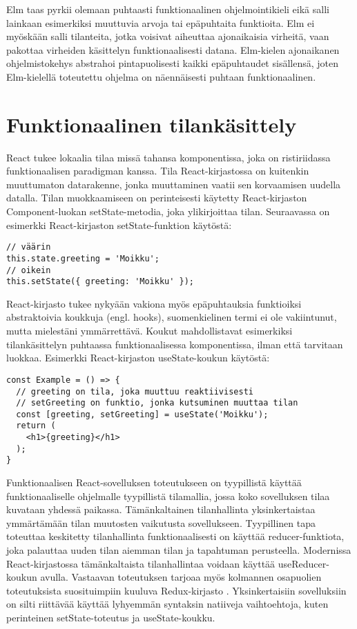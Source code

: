 Elm taas pyrkii olemaan puhtaasti funktionaalinen ohjelmointikieli eikä salli lainkaan esimerkiksi muuttuvia arvoja tai
epäpuhtaita funktioita. Elm ei myöskään salli tilanteita, jotka voisivat aiheuttaa ajonaikaisia virheitä, vaan pakottaa
virheiden käsittelyn funktionaalisesti datana. Elm-kielen ajonaikanen ohjelmistokehys abstrahoi pintapuolisesti kaikki
epäpuhtaudet sisällensä, joten Elm-kielellä toteutettu ohjelma on näennäisesti puhtaan funktionaalinen. \cite{elmlang}

\section{Funktionaalinen tilankäsittely}
React tukee lokaalia tilaa missä tahansa komponentissa, joka on ristiriidassa funktionaalisen paradigman kanssa. Tila
React-kirjastossa on kuitenkin muuttumaton datarakenne, jonka muuttaminen vaatii sen korvaamisen uudella datalla. Tilan
muokkaamiseen on perinteisesti käytetty React-kirjaston Component-luokan setState-metodia, joka ylikirjoittaa tilan.
Seuraavassa on esimerkki React-kirjaston setState-funktion käytöstä:
\begin{verbatim}
// väärin
this.state.greeting = 'Moikku';
// oikein
this.setState({ greeting: 'Moikku' });
\end{verbatim}
React-kirjasto tukee nykyään vakiona myös epäpuhtauksia funktioiksi abstraktoivia koukkuja (engl. hooks), suomenkielinen
termi ei ole vakiintunut, mutta mielestäni ymmärrettävä. Koukut mahdollistavat esimerkiksi tilankäsittelyn puhtaassa
funktionaalisessa komponentissa, ilman että tarvitaan luokkaa. Esimerkki React-kirjaston useState-koukun käytöstä:
\begin{verbatim}
const Example = () => {
  // greeting on tila, joka muuttuu reaktiivisesti
  // setGreeting on funktio, jonka kutsuminen muuttaa tilan
  const [greeting, setGreeting] = useState('Moikku');
  return (
    <h1>{greeting}</h1>
  );
}
\end{verbatim}

Funktionaalisen React-sovelluksen toteutukseen on tyypillistä käyttää funktionaaliselle ohjelmalle tyypillistä
tilamallia, jossa koko sovelluksen tilaa kuvataan yhdessä paikassa. Tämänkaltainen tilanhallinta yksinkertaistaa
ymmärtämään tilan muutosten vaikutusta sovellukseen. Tyypillinen tapa toteuttaa keskitetty tilanhallinta
funktionaalisesti on käyttää reducer-funktiota, joka palauttaa uuden tilan aiemman tilan ja tapahtuman perusteella.
Modernissa React-kirjastossa tämänkaltaista tilanhallintaa voidaan käyttää useReducer-koukun avulla. Vastaavan
toteutuksen tarjoaa myös kolmannen osapuolien toteutuksista suosituimpiin kuuluva Redux-kirjasto
\cite{functionalwebdev}. Yksinkertaisiin sovelluksiin on silti riittävää käyttää lyhyemmän syntaksin natiiveja
vaihtoehtoja, kuten perinteinen setState-toteutus ja useState-koukku. \cite{reactjs}


